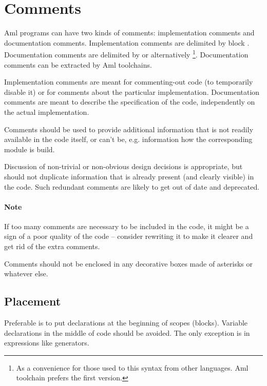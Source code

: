 \section{Comments}

Aml programs can have two kinds of comments: implementation comments and documentation comments. Implementation comments are delimited by block \code{(* $\ \ldots$ *)}. Documentation comments are delimited by \code{(*! $\ \ldots$ *)} or alternatively \code{(** $\ \ldots$ *)}\footnote{As a convenience for those used to this syntax from other languages. Aml toolchain prefers the first version.}. Documentation comments can be extracted by Aml toolchains.

Implementation comments are meant for commenting-out code (to temporarily disable it) or for comments about the particular implementation. Documentation comments are meant to describe the specification of the code, independently on the actual implementation. 

Comments should be used to provide additional information that is not readily available in the code itself, or can't be, e.g. information how the corresponding module is build. 

Discussion of non-trivial or non-obvious design decisions is appropriate, but should not duplicate information that is already present (and clearly visible) in the code. Such redundant comments are likely to get out of date and deprecated. 

\paragraph{Note}
If too many comments are necessary to be included in the code, it might be a sign of a poor quality of the code -- consider rewriting it to make it clearer and get rid of the extra comments. 

Comments should not be enclosed in any decorative boxes made of asterisks or whatever else. 





\subsection{Placement}

Preferable is to put declarations at the beginning of scopes (blocks). Variable declarations in the middle of code should be avoided. The only exception is in expressions like generators. 

